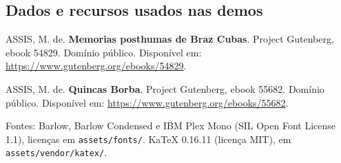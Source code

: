 \documentclass[11pt,a4paper]{article}
\begin{document}
\subsection{Dados e recursos usados nas demos}
ASSIS, M. de. \textbf{Memorias posthumas de Braz Cubas}. Project Gutenberg, ebook 54829. Domínio público. Disponível em: \url{https://www.gutenberg.org/ebooks/54829}.\par
ASSIS, M. de. \textbf{Quincas Borba}. Project Gutenberg, ebook 55682. Domínio público. Disponível em: \url{https://www.gutenberg.org/ebooks/55682}.\par
Fontes: Barlow, Barlow Condensed e IBM Plex Mono (SIL Open Font License 1.1), licenças em \texttt{assets/\allowbreak{}fonts/\allowbreak{}}. KaTeX 0.16.11 (licença MIT), em \texttt{assets/\allowbreak{}vendor/\allowbreak{}katex/\allowbreak{}}.\par
\endgroup
\end{document}
